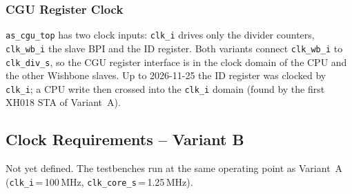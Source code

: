 \subsubsection{CGU Register Clock}
\label{subsubsec:cguRegClock}

\texttt{as\_cgu\_top} has two clock inputs: \texttt{clk\_i} drives only
the divider counters, \texttt{clk\_wb\_i} the slave BPI and the ID
register. Both variants connect \texttt{clk\_wb\_i} to
\texttt{clk\_div\_s}, so the CGU register interface is in the clock
domain of the CPU and the other Wishbone slaves. Up to 2026-11-25 the ID
register was clocked by \texttt{clk\_i}; a CPU write then crossed into
the \texttt{clk\_i} domain (found by the first XH018 STA of Variant~A).

\subsection{Clock Requirements -- Variant B}
\label{subsec:clockReqB}

Not yet defined. The testbenches run at the same operating point as
Variant~A (\texttt{clk\_i}\,=\,100\,MHz, \texttt{clk\_core\_s}\,=\,1.25\,MHz).
